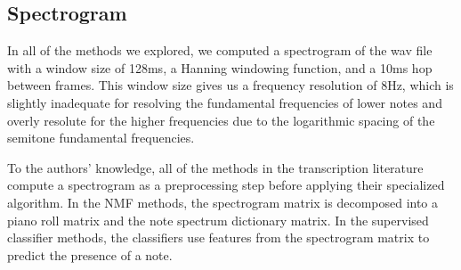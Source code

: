 \documentclass[5p]{elsarticle}
\begin{document}




\subsection{Spectrogram}

In all of the methods we explored, we computed a spectrogram of the wav file with a window size of 128ms, a Hanning windowing function, and a 10ms hop between frames. This window size gives us a frequency resolution of 8Hz, which is slightly inadequate for resolving the fundamental frequencies of lower notes and overly resolute for the higher frequencies due to the logarithmic spacing of the semitone fundamental frequencies.

To the authors' knowledge, all of the methods in the transcription literature compute a spectrogram as a preprocessing step before applying their specialized algorithm. In the NMF methods, the spectrogram matrix is decomposed into a piano roll matrix and the note spectrum dictionary matrix. In the supervised classifier methods, the classifiers use features from the spectrogram matrix to predict the presence of a note.
\end{document}
